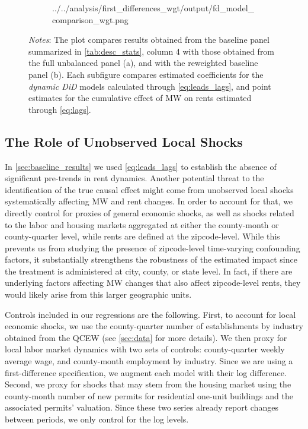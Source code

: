 \begin{figure}[htb!]
\begin{subfigure}[b]{0.8\textwidth}
        {../../analysis/first_differences_wgt/output/fd_model_comparison_wgt.png}
    \end{subfigure}
    \begin{minipage}{0.95\textwidth} \footnotesize
		\vspace{2mm} 
		\textit{Notes}: The plot compares results obtained from the baseline panel summarized in 
		\autoref{tab:desc_stats}, column 4 with those obtained from the full unbalanced panel (a), 
		and with the reweighted baseline panel (b). Each subfigure compares estimated coefficients 
		for the \textit{dynamic DiD} models calculated through \autoref{eq:leads_lags}, and point 
		estimates for the cumulative effect of MW on rents estimated through \autoref{eq:lags}.   
	\end{minipage}
\end{figure}


\subsection{The Role of Unobserved Local Shocks}\label{sec:econ_shocks}

In \autoref{sec:baseline_results} we used \autoref{eq:leads_lags} to establish the absence of 
significant pre-trends in rent dynamics. Another potential threat to the identification of the true 
causal effect might come from unobserved local shocks systematically affecting MW and rent changes. 
In order to account for that, we directly control for proxies of general economic shocks, as well as 
shocks related to the labor and housing markets aggregated at either the county-month or 
county-quarter level, while rents are defined at the zipcode-level. While this prevents us from 
studying the presence of zipcode-level time-varying confounding factors, it substantially strengthens 
the robustness of the estimated impact since the treatment is administered at city, county, or state 
level. In fact, if there are underlying factors affecting MW changes that also affect zipcode-level 
rents, they would likely arise from this larger geographic units.

Controls included in our regressions are the following. First, to account for local economic shocks, 
we use the county-quarter number of establishments by industry obtained from the QCEW (see 
\autoref{sec:data} for more details). We then proxy for local labor market dynamics with two sets 
of controls: county-quarter weekly average wage, and county-month employment by industry. Since we 
are using a first-difference specification, we augment each model with their log difference. Second, 
we proxy for shocks that may stem from the housing market using the county-month number of new 
permits for residential one-unit buildings and the associated permits' valuation. Since these two 
series already report changes between periods, we only control for the log levels.

